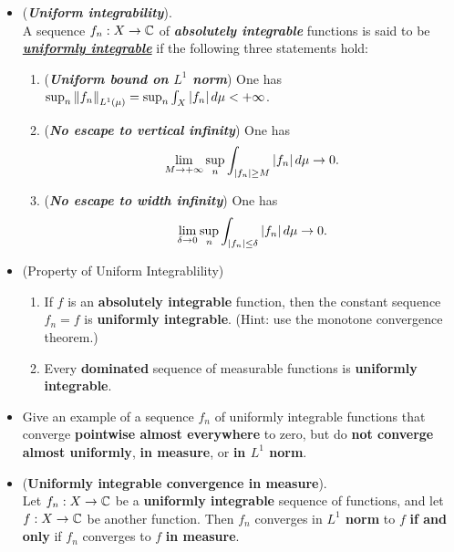 \documentclass[11pt]{article}
\begin{document}
\begin{itemize}
\item \begin{definition} (\textbf{\emph{Uniform integrability}}).\\
A sequence $f_n : X \rightarrow {\mathbb C}$ of \textbf{\emph{absolutely integrable}} functions is said to be \underline{\textbf{\emph{uniformly integrable}}} if the following three statements hold:
\begin{enumerate}
\item (\textbf{\emph{Uniform bound on $L^1$ norm}}) One has $\sup_{n}\left\|f_n\right\|_{L^1(\mu)} = \sup_{n}\int_X \left\lvert f_n \right\rvert d\mu < +\infty$.
\item (\textbf{\emph{No escape to vertical infinity}}) One has 
\begin{align*}
\lim\limits_{M \rightarrow +\infty}\sup_{n}\int_{\left\lvert f_n \right\rvert \ge M} \left\lvert f_n \right\rvert d\mu \rightarrow 0.
\end{align*}
\item (\textbf{\emph{No escape to width infinity}})  One has 
\begin{align*}
\lim\limits_{\delta \rightarrow 0}\sup_{n}\int_{\left\lvert f_n \right\rvert \le \delta} \left\lvert f_n \right\rvert d\mu \rightarrow 0.
\end{align*}
\end{enumerate}
\end{definition}

\item \begin{proposition} (Property of Uniform Integrablility)
\begin{enumerate}
\item If $f$ is an \textbf{absolutely integrable} function, then the constant sequence $f_n = f$ is \textbf{uniformly integrable}. (Hint: use the monotone convergence theorem.)
\item Every \textbf{dominated} sequence of measurable functions is \textbf{uniformly integrable}.
\end{enumerate}
\end{proposition}

\item \begin{exercise}
Give an example of a sequence $f_n$ of uniformly integrable functions that converge \textbf{pointwise almost everywhere} to
zero, but do \textbf{not converge} \textbf{almost uniformly}, \textbf{in measure}, or \textbf{in $L^1$ norm}.
\end{exercise}

\item \begin{theorem} (\textbf{Uniformly integrable convergence in measure}).\\
Let $f_n : X \rightarrow {\mathbb C}$ be a \textbf{uniformly integrable} sequence of functions, and let $f : X \rightarrow {\mathbb C}$ be another function. Then $f_n$ converges in \textbf{$L^1$ norm} to $f$ \textbf{if and only} if $f_n$ converges to $f$ \textbf{in measure}.
\end{theorem}


\end{itemize}
\end{document}
